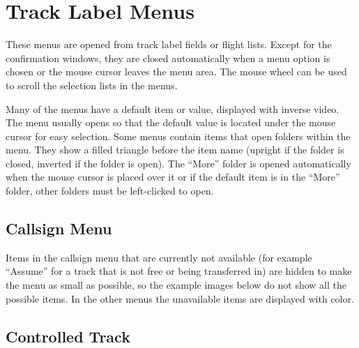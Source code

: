 \documentclass[a4paper,oneside,11pt]{memoir}
\begin{document}
\section{Track Label Menus}

These menus are opened from track label fields or flight lists. Except for the confirmation windows, they are closed automatically when a menu option is chosen or the mouse cursor leaves the menu area. The mouse wheel can be used to scroll the selection lists in the menus.

\bigskip

Many of the menus have a default item or value, displayed with inverse video. The menu usually opens so that the default value is located under the mouse cursor for easy selection. Some menus contain items that open folders within the menu. They show a filled triangle before the item name (upright if the folder is closed, inverted if the folder is open). The “More” folder is opened automatically when the mouse cursor is placed over it or if the default item is in the “More” folder, other folders must be left-clicked to open.

\subsection{Callsign Menu}\label{menu:cs}

Items in the callsign menu that are currently not available (for example “Assume” for a track that is not free or being transferred in) are hidden to make the menu as small as possible, so the example images below do not show all the possible items. In the other menus the unavailable items are displayed with  color.

\subsection*{Controlled Track}

\end{document}

